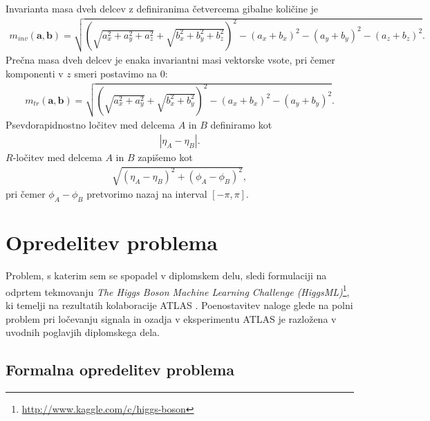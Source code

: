 \documentclass[11pt,a4paper,openany]{book}
\begin{document}
Invarianta masa dveh delcev z definiranima četvercema gibalne količine je
\begin{eqnarray}
	m_{inv}(\mathbf{a}, \mathbf{b}) =
		\sqrt{
			\left(
				\sqrt{a_x^2 + a_y^2 + a_z^2} + \sqrt{b_x^2 + b_y^2 + b_z^2}
			\right)^2
			- (a_x + b_x)^2
			- (a_y + b_y)^2
			- (a_z + b_z)^2
		}.
	\label{eq:invmass}
\end{eqnarray}
Prečna masa dveh delcev je enaka invariantni masi vektorske vsote, pri čemer komponenti v $z$ smeri postavimo na 0:
\begin{eqnarray}
	m_{tr}(\mathbf{a}, \mathbf{b}) =
		\sqrt{
			\left(
			\sqrt{a_x^2 + a_y^2} + \sqrt{b_x^2 + b_y^2}
			\right)^2
			- (a_x + b_x)^2
			- (a_y + b_y)^2
		}.	
	\label{eq:invmasstransverse}
\end{eqnarray}
Psevdorapidnostno ločitev med delcema $A$ in $B$ definiramo kot
\begin{eqnarray}
	|\eta_A - \eta_B|.
	\label{eq:pseudorapidityseparation}
\end{eqnarray}
$R$-ločitev med delcema $A$ in $B$ zapišemo kot
\begin{eqnarray}
	\sqrt{(\eta_A - \eta_B)^2 + (\phi_A - \phi_B)^2},
	\label{eq:rseparation}
\end{eqnarray}
pri čemer $\phi_A - \phi_B$ pretvorimo nazaj na interval $[-\pi, \pi]$.
\chapter{Opredelitev problema}

Problem, s katerim sem se spopadel v diplomskem delu, sledi formulaciji na odprtem tekmovanju \textit{The Higgs Boson Machine Learning Challenge (HiggsML)}\footnote{ \url{http://www.kaggle.com/c/higgs-boson}}, ki temelji na rezultatih kolaboracije ATLAS \cite{Adam-Bourdarios14}. Poenostavitev naloge glede na polni problem pri ločevanju signala in ozadja v eksperimentu ATLAS je razložena v uvodnih poglavjih diplomskega dela.

\section{Formalna opredelitev problema}
\end{document}
